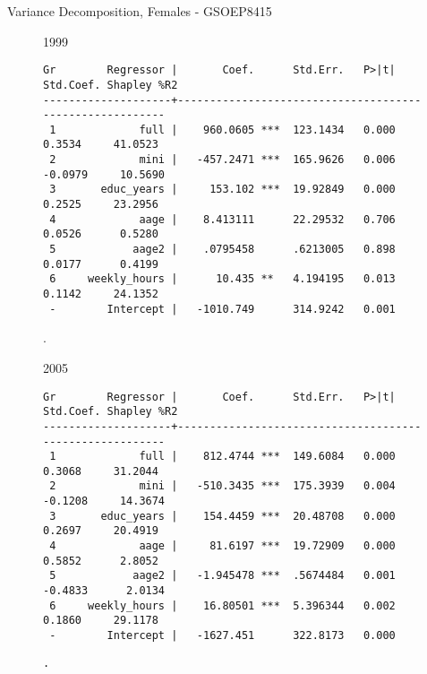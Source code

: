 \documentclass{beamer}
\begin{document}
\begin{frame}[fragile]{Variance Decomposition, Females - GSOEP8415}
\begin{figure}
\centering
\begin{minipage}[b]{0.4\textwidth}{1999}
\begin{Verbatim}[fontsize=\tiny]
Gr        Regressor |       Coef.      Std.Err.   P>|t|  Std.Coef. Shapley %R2
--------------------+---------------------------------------------------------
 1             full |    960.0605 ***  123.1434   0.000     0.3534     41.0523
 2             mini |   -457.2471 ***  165.9626   0.006    -0.0979     10.5690
 3       educ_years |     153.102 ***  19.92849   0.000     0.2525     23.2956
 4             aage |    8.413111      22.29532   0.706     0.0526      0.5280
 5            aage2 |    .0795458      .6213005   0.898     0.0177      0.4199
 6     weekly_hours |      10.435 **   4.194195   0.013     0.1142     24.1352
 -        Intercept |   -1010.749      314.9242   0.001  
\end{Verbatim}
\end{minipage}
\begin{minipage}{0.4\textwidth}
.
\end{minipage}
\end{figure}
\begin{figure}
\centering
\begin{minipage}[b]{0.4\textwidth}{2005}
\begin{Verbatim}[fontsize=\tiny]
Gr        Regressor |       Coef.      Std.Err.   P>|t|  Std.Coef. Shapley %R2
--------------------+---------------------------------------------------------
 1             full |    812.4744 ***  149.6084   0.000     0.3068     31.2044
 2             mini |   -510.3435 ***  175.3939   0.004    -0.1208     14.3674
 3       educ_years |    154.4459 ***  20.48708   0.000     0.2697     20.4919
 4             aage |     81.6197 ***  19.72909   0.000     0.5852      2.8052
 5            aage2 |   -1.945478 ***  .5674484   0.001    -0.4833      2.0134
 6     weekly_hours |    16.80501 ***  5.396344   0.002     0.1860     29.1178
 -        Intercept |   -1627.451      322.8173   0.000   
\end{Verbatim}
\end{minipage}
\begin{minipage}[b]{0.4\textwidth}
\begin{Verbatim}[fontsize=\tiny]
.
\end{Verbatim}
\end{minipage}
\end{figure}
\end{frame}
\end{document}
